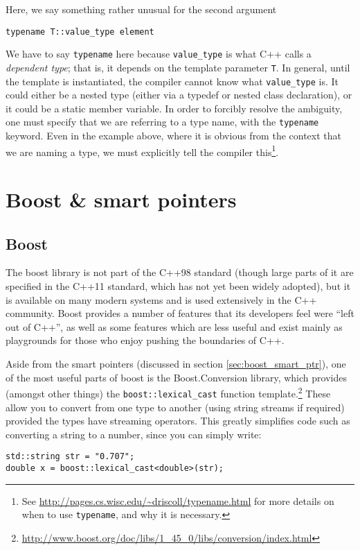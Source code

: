 \documentclass[a4paper]{scrartcl}
\begin{document}
Here, we say something rather unusual for the second argument
\begin{verbatim}
typename T::value_type element
\end{verbatim}

We have to say \verb|typename| here because \verb|value_type| is what C++ calls a \emph{dependent type}; that is, it depends on the template parameter \verb|T|. In general, until the template is instantiated, the compiler cannot know what \verb|value_type| is. It could either be a nested type (either via a typedef or nested class declaration), or it could be a static member variable. In order to forcibly resolve the ambiguity, one must specify that we are referring to a type name, with the \verb|typename| keyword. Even in the example above, where it is obvious from the context that we are naming a type, we must explicitly tell the compiler this\footnote{See \url{http://pages.cs.wisc.edu/~driscoll/typename.html} for more details on when to use \texttt{typename}, and why it is necessary.}. 

\section{Boost \& smart pointers}\label{sec:boost}
\subsection{Boost}
The boost library is not part of the C++98 standard (though large parts of it are specified in the C++11 standard, which has not yet been widely adopted), but it is available on many modern systems and is used extensively in the C++ community. Boost provides a number of features that its developers feel were ``left out of C++'', as well as some features which are less useful and exist mainly as playgrounds for those who enjoy pushing the boundaries of C++.

Aside from the smart pointers (discussed in section \ref{sec:boost_smart_ptr}), one of the most useful parts of boost is the Boost.Conversion library, which provides (amongst other things) the \verb|boost::lexical_cast| function template.\footnote{\url{http://www.boost.org/doc/libs/1_45_0/libs/conversion/index.html}} These allow you to convert from one type to another (using string streams if required) provided the types have streaming operators. This greatly simplifies code such as converting a string to a number, since you can simply write:

\begin{verbatim}
std::string str = "0.707";
double x = boost::lexical_cast<double>(str);
\end{verbatim}
\end{document}
